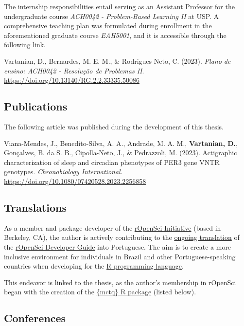 \documentclass[
12pt,
openright,
oneside,
a4paper,
chapter=TITLE,
section=TITLE,
french,
spanish,
brazil,
english
]{abntex2}\usepackage{array}
\begin{document}
The internship responsibilities entail serving as an Assistant Professor
for the undergraduate course \emph{ACH0042 - Problem-Based Learning II}
at USP. A comprehensive teaching plan \autocite{vartanian2023e} was
formulated during enrollment in the aforementioned graduate course
\emph{EAH5001}, and it is accessible through the following link.

\smallskip

\noindent Vartanian, D., Bernardes, M. E. M., \& Rodrigues Neto, C.
(2023). \emph{Plano de ensino: ACH0042 - Resolução de Problemas II}.
\url{https://doi.org/10.13140/RG.2.2.33335.50086}

\subsection{Publications}\label{publications}

The following article \autocite{viana-mendes2023} was published during
the development of this thesis.

\smallskip

\noindent Viana-Mendes, J., Benedito-Silva, A. A., Andrade, M. A. M.,
\textbf{Vartanian, D.}, Gonçalves, B. da S. B., Cipolla-Neto, J., \&
Pedrazzoli, M. (2023). Actigraphic characterization of sleep and
circadian phenotypes of PER3 gene VNTR genotypes. \emph{Chronobiology
International}. \url{https://doi.org/10.1080/07420528.2023.2256858}

\subsection{Translations}\label{translations}

As a member and package developer of the
\href{https://ropensci.org/}{rOpenSci Initiative} (based in Berkeley,
CA), the author is actively contributing to the
\href{https://github.com/ropensci/dev_guide/pull/717}{ongoing
translation} of the \href{https://devguide.ropensci.org/}{rOpenSci
Developer Guide} into Portuguese. The aim is to create a more inclusive
environment for individuals in Brazil and other Portuguese-speaking
countries when developing for the \href{https://www.r-project.org/}{R
programming language}.

This endeavor is linked to the thesis, as the author's membership in
rOpenSci began with the creation of the
\href{https://docs.ropensci.org/mctq/}{\{mctq\} R package} (listed
below).

\subsection{Conferences}\label{conferences}
\end{document}
